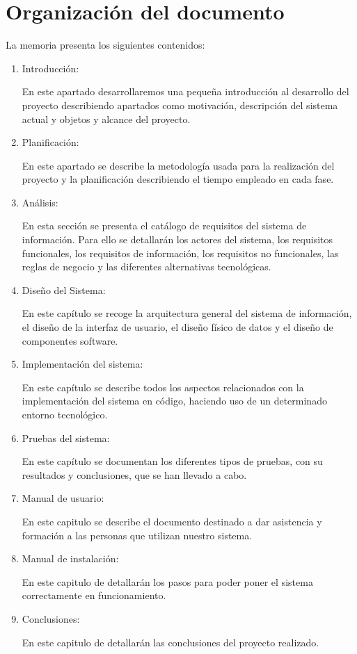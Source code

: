 \section{Organización del documento}

La memoria presenta los siguientes contenidos:\\

\begin{enumerate}

\item Introducción:

En este apartado desarrollaremos una pequeña introducción al desarrollo del proyecto describiendo apartados como motivación, descripción del sistema actual y objetos y alcance del proyecto.

\item Planificación: 

En este apartado se describe la metodología usada para la realización del proyecto y la planificación describiendo el tiempo empleado en cada fase.

\item Análisis:

En esta sección se presenta el catálogo de requisitos del sistema de información. Para ello se detallarán los actores del sistema, los requisitos funcionales, los requisitos de información, los requisitos no funcionales, las reglas de negocio y las diferentes alternativas
tecnológicas.

\item Diseño del Sistema:

En este capítulo se recoge la arquitectura general del sistema de información, el diseño de la interfaz de usuario, el diseño físico de datos y el diseño de componentes software.

\item Implementación del sistema:
 
En este capítulo se describe todos los aspectos relacionados con la implementación del sistema en código, haciendo uso de un determinado entorno tecnológico.

\item Pruebas del sistema:

En este capítulo se documentan los diferentes tipos de pruebas, con su resultados y conclusiones, que se han llevado a cabo.

\item Manual de usuario:

 En este capitulo se describe el documento destinado a dar asistencia y formación a las personas que utilizan nuestro sistema.
\item Manual de instalación:

 En este capitulo de detallarán los pasos para poder poner el sistema correctamente en funcionamiento.
\item Conclusiones:

 En este capitulo de detallarán las conclusiones del proyecto realizado.
 \end{enumerate}
 